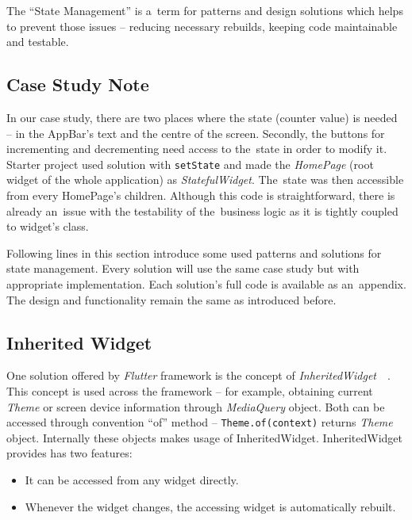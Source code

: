 The ``State Management'' is a~term for patterns and design solutions which helps to prevent those issues -- reducing necessary rebuilds, keeping code maintainable and testable. 
\subsection{Case Study Note}
In our case study, there are two places where the state (counter value) is needed -- in the AppBar's text and the centre of the screen. Secondly, the buttons for incrementing and decrementing need access to the~state in order to modify it. Starter project used solution with \verb|setState| and made the \textit{HomePage} (root widget of the whole application) as \textit{StatefulWidget}. The~state was then accessible from every HomePage's children. Although this code is straightforward, there is already an~issue with the testability of the~business logic as it is tightly coupled to widget's class.  

Following lines in this section introduce some used patterns and solutions for state management.  Every solution will use the same case study but with appropriate implementation. Each solution's full code is available as an~appendix. The design and functionality remain the same as introduced before.
\subsection{Inherited Widget}
One solution offered by \textit{Flutter} framework is the concept of \textit{InheritedWidget}~\cite{flutter-inherited-widget}~\cite{notion-widget-didier}. This concept is used across the framework -- for example, obtaining current \textit{Theme} or screen device information through \textit{MediaQuery} object. Both can be accessed through convention ``of'' method -- \verb|Theme.of(context)| returns \textit{Theme} object. Internally these objects makes usage of InheritedWidget. InheritedWidget provides has two features:

\begin{itemize}
    \item It can be accessed from any widget directly.
    \item Whenever the widget changes, the accessing widget is automatically rebuilt.
\end{itemize}


